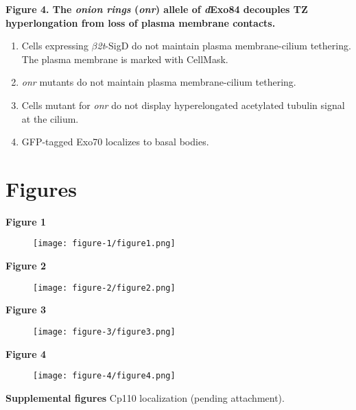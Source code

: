 \documentclass[12pt, twoside, letterpaper]{article}
\newcommand{\sigd}{$\beta$\textit{2t}-SigD}
\begin{document}
\begin{doublespacing}
\begin{linenumbers}
    \textbf{Figure 4. The \textit{onion rings} (\textit{onr}) allele of \textit{d}Exo84 decouples TZ hyperlongation from loss of plasma membrane contacts.}
    \begin{enumerate}[label={(\Alph*)}, nolistsep]
    \item Cells expressing \sigd{} do not maintain plasma membrane-cilium tethering. The plasma membrane is marked with CellMask.
    \item \textit{onr} mutants do not maintain plasma membrane-cilium tethering.
    \item Cells mutant for \textit{onr} do not display hyperelongated acetylated tubulin signal at the cilium.
    \item GFP-tagged Exo70 localizes to basal bodies.
    \end{enumerate}
    
  \end{linenumbers}
\end{doublespacing}



\newpage

\section{Figures}

\textbf{Figure 1}
\begin{figure}[ht]
  \texttt{[image: figure-1/figure1.png]}
\end{figure}
\newpage

\textbf{Figure 2}
\begin{figure}[ht]
  \texttt{[image: figure-2/figure2.png]}
\end{figure}
\newpage

\textbf{Figure 3}
\begin{figure}[ht]
  \texttt{[image: figure-3/figure3.png]}
\end{figure}
\newpage

\textbf{Figure 4}
\begin{figure}[ht]
  \texttt{[image: figure-4/figure4.png]}
\end{figure}
\newpage

\textbf{Supplemental figures}
Cp110 localization (pending attachment).
\end{document}
